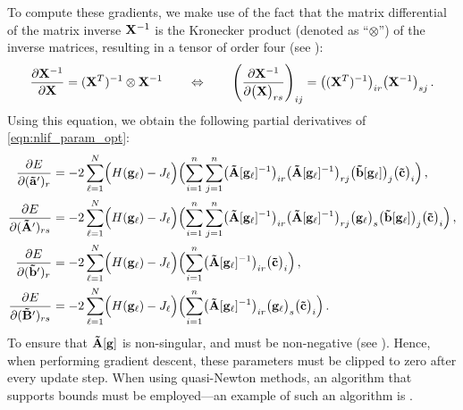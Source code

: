 To compute these gradients, we make use of the fact that the matrix differential of the matrix inverse $\mathbf{X}^{-1}$ is the Kronecker product (denoted as \enquote{$\otimes$}) of the inverse matrices, resulting in a tensor of order four (see \cite[Section~10.6, eq.~1, p.~198]{lutkepohl1997handbook}):
\begin{align}
	\frac{\partial \mathbf{X}^{-1}}{\partial \mathbf{X}}
		= (\mathbf{X}^T)^{-1} \otimes \mathbf{X}^{-1}
	\quad \quad \Leftrightarrow \quad \quad
	\left( \frac{\partial \mathbf{X}^{-1}}{\partial \bigl(\mathbf{X}\bigr)_{rs}} \right)_{ij} =
		\bigl((\mathbf{X}^T)^{-1}\bigr)_{ir} \bigl(\mathbf{X}^{-1}\bigr)_{sj} \,.
	\label{eqn:inverse_differential_tensor}
\end{align}
Using this equation, we obtain the following partial derivatives of \cref{eqn:nlif_param_opt}:%
\begin{align}
	\frac{\partial E}{\partial (\vrap)_{r}} &=
	-2 \sum_{\ell = 1}^N
	\Bigl(H(\vec g_\ell) - J_\ell \Bigr)
   	\Bigl(
   	\sum_{i = 1}^n \sum_{j = 1}^n \bigl( \mrA[\vec g_\ell]^{-1} \bigr)_{ir} \bigl( \mrA[\vec g_\ell]^{-1} \bigr)_{r j} \bigl( \vrb[\vec g_\ell] \bigr)_j \bigl(\vrc\bigr)_i
   	\Bigr) \label{eqn:nlif_parm_grad_a} \,,\\%
%
	\frac{\partial E}{\partial (\mrAp)_{rs}} &=
	-2 \sum_{\ell = 1}^N
	\Bigl(H(\vec g_\ell) - J_\ell \Bigr)
   	\Bigl(
   	\sum_{i = 1}^n \sum_{j = 1}^n \bigl( \mrA[\vec g_\ell]^{-1} \bigr)_{i r} \bigl( \mrA[\vec g_\ell]^{-1} \bigr)_{r j}  \bigl(\vec g_\ell\bigr)_s \bigl( \vrb[\vec g_\ell] \bigr)_j \bigl(\vrc\bigr)_i
   	\Bigr) \label{eqn:nlif_parm_grad_A} \,, \\%
%
	\frac{\partial E}{\partial (\vrbp)_{r}} &=
	-2 \sum_{\ell = 1}^N
	\Bigl(H(\vec g_\ell) - J_\ell \Bigr)
   	\Bigl(
   	\sum_{i=1}^n 
   	 \bigl( \mrA[\vec g_\ell]^{-1} \bigr)_{ir} \bigl(\vrc\bigr)_i
   	\Bigr) \label{eqn:nlif_parm_grad_b} \,, \\%
%
	\frac{\partial E}{\partial (\mrBp)_{rs}} &=
	-2 \sum_{\ell = 1}^N
	\Bigl(H(\vec g_\ell) - J_\ell \Bigr)
   	\Bigl(
   	\sum_{i=1}^n 
   	 \bigl( \mrA[\vec g_\ell]^{-1} \bigr)_{ir} \bigl( \vec g_\ell \bigr)_s \bigl(\vrc\bigr)_i
   	\Bigr) \label{eqn:nlif_parm_grad_B}\,.
\end{align}
To ensure that $\mathbf{\tilde A}[\mathbf{g}]$ is non-singular, \vrap and \mrAp must be non-negative (see ).
Hence, when performing gradient descent, these parameters must be clipped to zero after every update step.
When using quasi-Newton methods, an algorithm that supports bounds must be employed---an example of such an algorithm is \LBFGSB \citep{byrd1995limited}.

